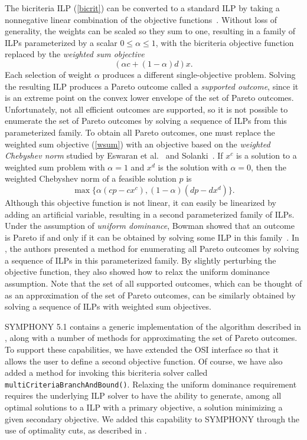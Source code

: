 The bicriteria ILP (\ref{bicrit}) can be converted to a standard ILP by
taking a nonnegative linear combination of the objective
functions~\cite{geoff68}. Without loss of generality, the weights can be
scaled so they sum to one, resulting in a family of ILPs parameterized by a
scalar $0 \leq \alpha \leq 1$, with the bicriteria objective function replaced
by the \emph{weighted sum objective}
\begin{equation}\label{wsum}
(\alpha c + (1 - \alpha) d) x.
\end{equation}
Each selection of weight $\alpha$ produces a different single-objective
problem. Solving the resulting ILP produces a Pareto outcome called a
\emph{supported outcome}, since it is an extreme point on the convex lower
envelope of the set of Pareto outcomes. Unfortunately, not all efficient
outcomes are supported, so it is not possible to enumerate the set of Pareto
outcomes by solving a sequence of ILPs from this parameterized family. To
obtain all Pareto outcomes, one must replace the weighted sum objective
(\ref{wsum}) with an objective based on the \emph{weighted Chebyshev norm}
studied by Eswaran et al.~\cite{eswaran89} and Solanki~\cite{solanki91}. If
$x^c$ is a solution to a weighted sum problem with $\alpha = 1$ and $x^d$ is
the solution with $\alpha = 0$, then the weighted Chebyshev norm of a feasible
solution $p$ is
\begin{equation}
\max \{\alpha (cp - cx^c), (1 - \alpha)(dp - dx^d)\}.
\label{chebyshev}
\end{equation} 
Although this objective function is not linear, it can easily be linearized by
adding an artificial variable, resulting in a second parameterized family of
ILPs. Under the assumption of \emph{uniform dominance}, Bowman showed that an
outcome is Pareto if and only if it can be obtained by solving some ILP in
this family~\cite{bowman76}. In \cite{WCN}, the authors presented a method for
enumerating all Pareto outcomes by solving a sequence of ILPs in this
parameterized family. By slightly perturbing the objective function, they also
showed how to relax the uniform dominance assumption. Note that the set of all
supported outcomes, which can be thought of as an approximation of the set of
Pareto outcomes, can be similarly obtained by solving a sequence of ILPs with
weighted sum objectives.

SYMPHONY 5.1 contains a generic implementation of the algorithm described in
\cite{WCN}, along with a number of methods for approximating the set of Pareto
outcomes. To support these capabilities, we have extended the OSI interface so
that it allows the user to define a second objective function. Of course, we
have also added a method for invoking this bicriteria solver called
\texttt{multiCriteriaBranchAndBound()}. Relaxing the uniform dominance
requirement requires the underlying ILP solver to have the ability to
generate, among all optimal solutions to a ILP with a primary objective, a
solution minimizing a given secondary objective. We added this capability to
SYMPHONY through the use of optimality cuts, as described in \cite{WCN}.

